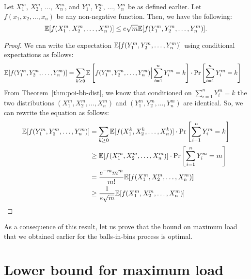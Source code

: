 \begin{theorem}
  Let $X_1^m$, $X_2^m$, $\ldots$, $X_n^m$, and $Y_1^m$, $Y_2^m$, $\ldots$,
  $Y_n^m$ be as defined earlier. Let $f(x_1,x_2,\ldots,x_n)$ be any non-negative
  function. Then, we have the following:
  \begin{align*}
    \mathbb{E}[f(X_1^m, X_2^m, \ldots, X_n^m)] \leq e\sqrt{m} \mathbb{E}[f(Y_1^m, Y_2^m, \ldots, Y_n^m)].
  \end{align*}
  \label{thm:bb-poi-bound}
\end{theorem}
\begin{proof}
  We can write the expectation $\mathbb{E}[f(Y_1^m, Y_2^m, \ldots, Y_n^m)]$ using
  conditional expectations as follows:
  \begin{align*}
    \mathbb{E}[f(Y_1^m, Y_2^m, \ldots, Y_n^m)] &= \sum_{k \geq 0} \mathbb{E}\left[f(Y_1^m, Y_2^m, \ldots, Y_n^m) \Big| \sum_{i=1}^n Y_i^m = k  \right]\cdot \Pr\left[ \sum_{i=1}^n Y_i^m = k \right]
  \end{align*}
  From Theorem~\ref{thm:poi-bb-dist}, we know that conditioned on
  $\sum_{i=1}^n Y_i^m = k$ the two distributions $(X_1^m,X_2^m,\ldots,X_n^m)$
  and $(Y_1^m, Y_2^m, \ldots, Y_n^m)$ are identical. So, we can rewrite the
  equation as follows:
  \begin{align*}
    \mathbb{E}[f(Y_1^m, Y_2^m, \ldots, Y_n^m)] &= \sum_{k \geq 0} \mathbb{E}[f(X_1^k, X_2^k, \ldots, X_n^k)]\cdot \Pr\left[ \sum_{i=1}^n Y_i^m = k \right]\\
                                       &\geq \mathbb{E}[f(X_1^m, X_2^m,\ldots,X_n^m)] \cdot \Pr\left[\sum_{i=1}^n Y_i^m = m \right]\\
                                       &= \frac{e^{-m}m^m}{m!} \mathbb{E}[f(X_1^m, X_2^m,\ldots,X_n^m)] \\
    &\geq \frac{1}{e\sqrt{m}} \mathbb{E}[f(X_1^m, X_2^m,\ldots,X_n^m)]
  \end{align*}
  
  
\end{proof}

As a consequence of this result, let us prove that the bound on maximum load
that we obtained earlier for the balls-in-bins process is optimal.

\section{Lower bound for maximum load}

